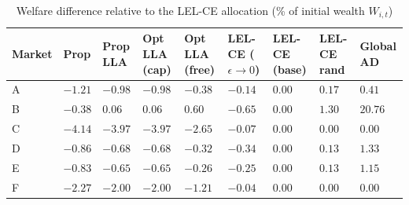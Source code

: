\begin{table}[htbp]
  \centering
  \small
  \caption{Welfare difference relative to the LEL-CE allocation (\% of initial wealth $W_{i,t}$)}
  \label{tab:welfare_diff_LEL}
  \vspace{0.5em}
  \setlength{\tabcolsep}{3pt} %
  \begin{tabularx}{\textwidth}{l *{8}{Y}}
    \toprule
    \textbf{Market} & 
    \textbf{Prop} & 
    \textbf{Prop} \newline \textbf{LLA} & 
    \textbf{Opt LLA} \newline \textbf{(cap)} & 
    \textbf{Opt LLA} \newline \textbf{(free)} & 
    \textbf{LEL-CE} \newline \textbf{($\epsilon \to 0$)} & 
    \textbf{LEL-CE} \newline \textbf{(base)} & 
    \textbf{LEL-CE} \newline \textbf{rand} & 
    \textbf{Global} \newline \textbf{AD} \\
    \midrule
    A & $-1.21$ & $-0.98$ & $-0.98$ & $-0.38$ & $-0.14$ & $0.00$ & $0.17$  & $0.41$  \\
    B & $-0.38$ &  $0.06$ &  $0.06$ &  $0.60$ & $-0.65$ & $0.00$ & $1.30$  & $20.76$ \\
    C & $-4.14$ & $-3.97$ & $-3.97$ & $-2.65$ & $-0.07$ & $0.00$ & $0.00$  & $0.00$  \\
    D & $-0.86$ & $-0.68$ & $-0.68$ & $-0.32$ & $-0.34$ & $0.00$ & $0.13$  & $1.33$  \\
    E & $-0.83$ & $-0.65$ & $-0.65$ & $-0.26$ & $-0.25$ & $0.00$ & $0.13$  & $1.15$  \\
    F & $-2.27$ & $-2.00$ & $-2.00$ & $-1.21$ & $-0.04$ & $0.00$ & $0.00$  & $0.00$  \\
    \bottomrule
  \end{tabularx}
\end{table}
